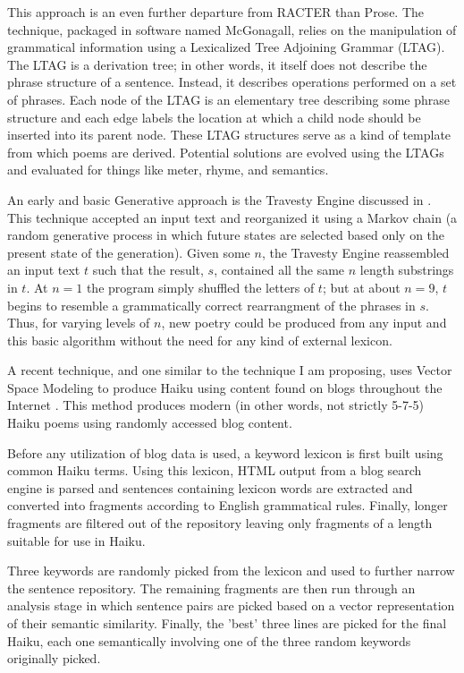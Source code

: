 \documentclass[10pt]{article}
\begin{document}
This approach is an even further departure from RACTER than Prose. The
technique, packaged in software named McGonagall, relies on the manipulation of
grammatical information using a Lexicalized Tree Adjoining Grammar (LTAG). The
LTAG is a derivation tree; in other words, it itself does not describe the
phrase structure of a sentence. Instead, it describes operations performed on a
set of phrases. Each node of the LTAG is an elementary tree describing some
phrase structure and each edge labels the location at which a child node should
be inserted into its parent node. These LTAG structures serve as a kind of
template from which poems are derived. Potential solutions are evolved using
the LTAGs and evaluated for things like meter, rhyme, and semantics.

An early and basic Generative approach is the Travesty Engine discussed in
\cite{Hart96}. This technique accepted an input text and reorganized it using a
Markov chain (a random generative process in which future states are selected
based only on the present state of the generation). Given some $n$, the
Travesty Engine reassembled an input text $t$ such that the result, $s$,
contained all the same $n$ length substrings in $t$. At $n = 1$ the program
simply shuffled the letters of $t$; but at about $n = 9$, $t$ begins to
resemble a grammatically correct rearrangment of the phrases in $s$. Thus, for
varying levels of $n$, new poetry could be produced from any input and this
basic algorithm without the need for any kind of external lexicon.

A recent technique, and one similar to the technique I am proposing, uses
Vector Space Modeling to produce Haiku using content found on blogs throughout
the Internet \cite{Wong08}. This method produces modern (in other words, not
strictly 5-7-5) Haiku poems using randomly accessed blog content. 

Before any utilization of blog data is used, a keyword lexicon is first built
using common Haiku terms. Using this lexicon, HTML output from a blog search
engine is parsed and sentences containing lexicon words are extracted and
converted into fragments according to English grammatical rules. Finally, longer
fragments are filtered out of the repository leaving only fragments of a length
suitable for use in Haiku.

Three keywords are randomly picked from the lexicon and used to further narrow
the sentence repository. The remaining fragments are then run through an
analysis stage in which sentence pairs are picked based on a vector
representation of their semantic similarity. Finally, the 'best' three lines
are picked for the final Haiku, each one semantically involving one of the
three random keywords originally picked.
\end{document}
